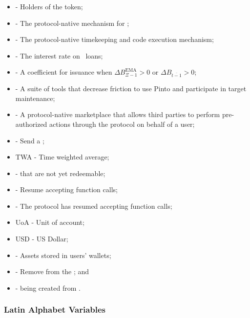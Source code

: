\documentclass[class=article, crop=false]{standalone}
\begin{document}
\begin{itemize}[topsep=0pt, itemsep=2pt,leftmargin=16pt]
    \item[]  - Holders of the  token;
    \item[]  - The protocol-native mechanism for ;
    \item[]  - The protocol-native timekeeping and code execution mechanism;
    \item[]  - The interest rate on \Pinto\ loans;
    \item[]  - A coefficient for  issuance when $\Delta B_{\Xi-1}^{\text{EMA}} > 0$ or $\Delta B_{\overline{t-1}} > 0$;
    \item[]  - A suite of tools that decrease friction to use Pinto and participate in target maintenance;
    \item[]  - A protocol-native marketplace that allows third parties to perform pre-authorized actions through the protocol on behalf of a user;
    \item[]  - Send a ;
    \item[] TWA - Time weighted average;
    \item[]  -  that are not yet redeemable;
    \item[]  - Resume accepting  function calls;
    \item[]  - The protocol has resumed accepting  function calls;
    \item[] UoA - Unit of account;
    \item[] USD - US Dollar;
    \item[]  - Assets stored in users' wallets;
    \item[]  - Remove from the ; and
    \item[]  -  being created from  \Pinto.
\end{itemize}


\subsubsection{Latin Alphabet Variables}
\end{document}
